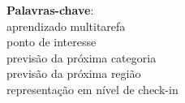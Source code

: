\begin{resumo}[Resumo]
        \vspace{\onelineskip}
        \noindent
        \begin{minipage}{\linewidth}
            \textbf{Palavras-chave}:\\
            aprendizado multitarefa\\
            ponto de interesse\\
            previsão da próxima categoria\\
            previsão da próxima região\\
            representação em nível de check-in
        \end{minipage}
    \end{resumo}

